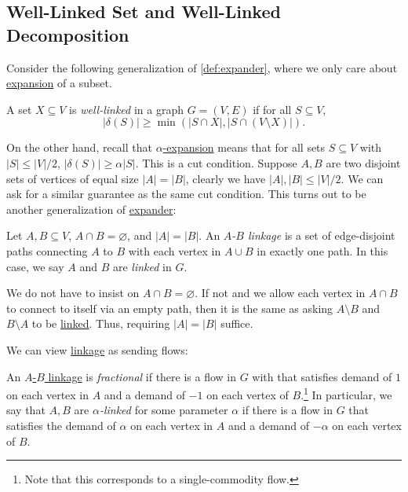 \subsection{Well-Linked Set and Well-Linked Decomposition}
Consider the following generalization of \autoref{def:expander}, where we only care about \hyperref[def:expansion]{expansion} of a subset.

\begin{definition}\label{def:well-linked}
	A set \(X \subseteq V\) is \emph{well-linked} in a graph \(G = (V, E)\) if for all \(S \subseteq V\),
	\[
		\lvert \delta (S) \rvert
		\geq \min (\lvert S \cap X \rvert , \lvert S \cap (V \setminus X) \rvert ).
	\]
\end{definition}

On the other hand, recall that \hyperref[def:expansion]{\(\alpha \)-expansion} means that for all sets \(S \subseteq V\) with \(\lvert S \rvert \leq \lvert V \rvert / 2\), \(\lvert \delta (S) \rvert \geq \alpha \lvert S \rvert \). This is a cut condition. Suppose \(A, B\) are two disjoint sets of vertices of equal size \(\lvert A \rvert = \lvert B \rvert \), clearly we have \(\lvert A \rvert , \lvert B \rvert \leq \lvert V \rvert / 2\). We can ask for a similar guarantee as the same cut condition. This turns out to be another generalization of \hyperref[def:expander]{expander}:

\begin{definition}[Linkage]\label{def:linkage}
	Let \(A, B \subseteq V\), \(A \cap B = \varnothing \), and \(\lvert A \rvert = \lvert B \rvert \). An \emph{\(A\)-\(B\) linkage} is a set of edge-disjoint paths connecting \(A\) to \(B\) with each vertex in \(A \cup B\) in exactly one path. In this case, we say \(A\) and \(B\) are \emph{linked} in \(G\).
\end{definition}

\begin{note}
	We do not have to insist on \(A \cap B = \varnothing \). If not and we allow each vertex in \(A \cap B\) to connect to itself via an empty path, then it is the same as asking \(A\setminus B\) and \(B\setminus A\) to be \hyperref[def:linkage]{linked}. Thus, requiring \(\lvert A \rvert = \lvert B \rvert \) suffice.
\end{note}

We can view \hyperref[def:linkage]{linkage} as sending flows:

\begin{definition}\label{def:fractional-linkage}
	An \hyperref[def:linkage]{\(A\)-\(B\) linkage} is \emph{fractional} if there is a flow in \(G\) with that satisfies demand of \(1\) on each vertex in \(A\) and a demand of \(-1\) on each vertex of \(B\).\footnote{Note that this corresponds to a single-commodity flow.} In particular, we say that \(A, B\) are \emph{\(\alpha \)-linked} for some parameter \(\alpha \) if there is a flow in \(G\) that satisfies the demand of \(\alpha \) on each vertex in \(A\) and a demand of \(-\alpha \) on each vertex of \(B\).
\end{definition}

